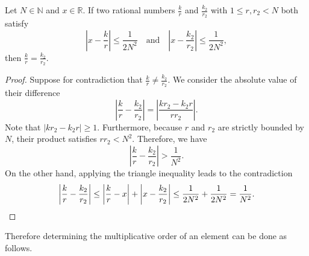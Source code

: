 \documentclass[a4paper, oneside, 12pt]{amsart}
\begin{document}
\begin{lemma}\label{lem:uniqueness}
  Let \(N \in \mathbb{N}\) and \(x \in \mathbb{R}\).
  If two rational numbers \(\frac{k}{r}\) and \(\frac{k_2}{r_2}\) with \(1 \leq r, r_2 < N\) both satisfy
  \begin{equation*}
    \left|x - \frac{k}{r} \right| \leq \frac{1}{2N^2} \quad \text{and} \quad \left| x - \frac{k_2}{r_2} \right| \leq \frac{1}{2N^2},
  \end{equation*}
  then \(\frac{k}{r} = \frac{k_2}{r_2}\).
\end{lemma}
\begin{proof}
  Suppose for contradiction that \(\frac{k}{r} \neq \frac{k_2}{r_2}\).
  We consider the absolute value of their difference
  \begin{equation*}
    \left| \frac{k}{r} - \frac{k_2}{r_2} \right| = \left| \frac{k r_2 - k_2 r}{r r_2} \right|.
  \end{equation*}
  Note that  \(\left|k r_2 - k_2 r\right|\geq 1\).
  Furthermore, because \(r\) and \(r_{2}\) are strictly bounded by \(N\), their product satisfies \(r r_2 < N^2\).
  Therefore, we have
  \begin{equation*}
    \left| \frac{k}{r} - \frac{k_2}{r_2} \right| > \frac{1}{N^2}.
  \end{equation*}
  On the other hand, applying the triangle inequality leads to the contradiction
  \begin{equation*}
    \left| \frac{k}{r} - \frac{k_2}{r_2} \right| \leq \left| \frac{k}{r} - x\right| + \left| x - \frac{k_2}{r_2} \right| \leq \frac{1}{2N^2} + \frac{1}{2N^2} = \frac{1}{N^2}. \qedhere
  \end{equation*}
\end{proof}

Therefore determining the multiplicative order of an element can be done as follows.

\medskip
\end{document}
